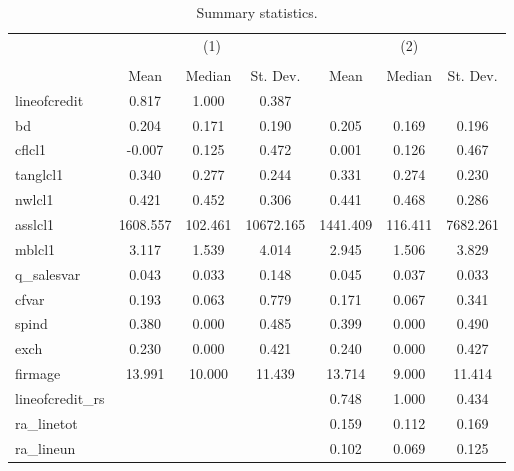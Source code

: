 \begin{table}[htbp]\centering
\def\sym#1{\ifmmode^{#1}\else\(^{#1}\)\fi}
\caption{Summary statistics.}
\begin{tabular}{l*{2}{ccc}}
\toprule
            &\multicolumn{3}{c}{(1)}               &\multicolumn{3}{c}{(2)}               \\
            &\multicolumn{3}{c}{}                  &\multicolumn{3}{c}{}                  \\
            &        Mean&      Median&    St. Dev.&        Mean&      Median&    St. Dev.\\
\midrule
lineofcredit&       0.817&       1.000&       0.387&            &            &            \\
bd          &       0.204&       0.171&       0.190&       0.205&       0.169&       0.196\\
cflcl1      &      -0.007&       0.125&       0.472&       0.001&       0.126&       0.467\\
tanglcl1    &       0.340&       0.277&       0.244&       0.331&       0.274&       0.230\\
nwlcl1      &       0.421&       0.452&       0.306&       0.441&       0.468&       0.286\\
asslcl1     &    1608.557&     102.461&   10672.165&    1441.409&     116.411&    7682.261\\
mblcl1      &       3.117&       1.539&       4.014&       2.945&       1.506&       3.829\\
q\_salesvar  &       0.043&       0.033&       0.148&       0.045&       0.037&       0.033\\
cfvar       &       0.193&       0.063&       0.779&       0.171&       0.067&       0.341\\
spind       &       0.380&       0.000&       0.485&       0.399&       0.000&       0.490\\
exch        &       0.230&       0.000&       0.421&       0.240&       0.000&       0.427\\
firmage     &      13.991&      10.000&      11.439&      13.714&       9.000&      11.414\\
lineofcredit\_rs&            &            &            &       0.748&       1.000&       0.434\\
ra\_linetot  &            &            &            &       0.159&       0.112&       0.169\\
ra\_lineun   &            &            &            &       0.102&       0.069&       0.125\\

\end{tabular}
\end{table}
